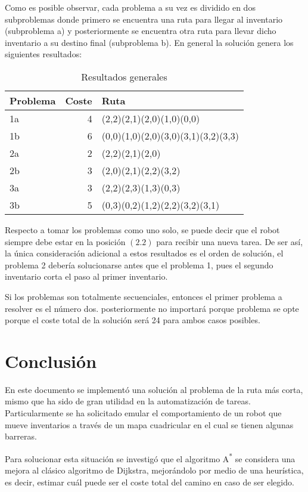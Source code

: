 \documentclass[a4paper,12pt]{article}
\begin{document}
Como es posible observar, cada problema a su vez es dividido en dos subproblemas donde primero se encuentra una ruta para llegar al inventario (subproblema a) y posteriormente se encuentra otra ruta para llevar dicho inventario a su destino final (subproblema b). En general la solución genera los siguientes resultados:

\begin{table}[htbp]
\caption{Resultados generales}
\centering
\begin{tabular}{lrl}
\hline
Problema & Coste & Ruta\\
\hline
1a & 4 & (2,2)(2,1)(2,0)(1,0)(0,0)\\
1b & 6 & (0,0)(1,0)(2,0)(3,0)(3,1)(3,2)(3,3)\\
2a & 2 & (2,2)(2,1)(2,0)\\
2b & 3 & (2,0)(2,1)(2,2)(3,2)\\
3a & 3 & (2,2)(2,3)(1,3)(0,3)\\
3b & 5 & (0,3)(0,2)(1,2)(2,2)(3,2)(3,1)\\
\hline
\end{tabular}
\end{table}

Respecto a tomar los problemas como uno solo, se puede decir que el robot siempre debe estar en la posición \((2 . 2)\) para recibir una nueva tarea. De ser así, la única consideración adicional a estos resultados es el orden de solución, el problema 2 debería solucionarse antes que el problema 1, pues el segundo inventario corta el paso al primer inventario.

Si los problemas son totalmente secuenciales, entonces el primer problema a resolver es el número dos. posteriormente no importará porque problema se opte porque el coste total de la solución será 24 para ambos casos posibles.

\section*{Conclusión}
\label{sec:org5934c98}

En este documento se implementó una solución al problema de la ruta más corta, mismo que ha sido de gran utilidad en la automatización de tareas. Particularmente se ha solicitado emular el comportamiento de un robot que mueve inventarios a través de un mapa cuadricular en el cual se tienen algunas barreras.

Para solucionar esta situación se investigó que el algoritmo A\textsuperscript{*} se considera una mejora al clásico algoritmo de Dijkstra, mejorándolo por medio de una heurística, es decir, estimar cuál puede ser el coste total del camino en caso de ser elegido.
\end{document}

